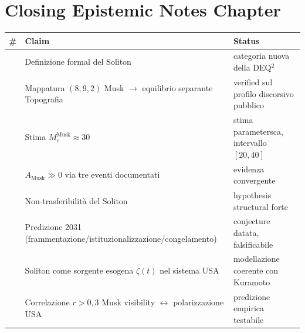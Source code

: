 \section{Closing Epistemic Notes
Chapter}\label{note-epistemiche-di-chiusura-chapter}

{\def\LTcaptype{none} %
{\small\begin{longtable}[]{@{}
  >{\raggedright\arraybackslash}p{}
  >{\raggedright\arraybackslash}p{}
  >{\raggedright\arraybackslash}p{}@{}}
\toprule\noalign{}
\begin{minipage}[b]{\linewidth}\raggedright
\#
\end{minipage} & \begin{minipage}[b]{\linewidth}\raggedright
Claim
\end{minipage} & \begin{minipage}[b]{\linewidth}\raggedright
Status
\end{minipage} \\
\midrule\noalign{}
\endhead
\bottomrule\noalign{}
\endlastfoot
1 & Definizione formal del Soliton & \Hypoth{} categoria nuova della
DEQ$^2$ \\
2 & Mappatura \((8, 9, 2)\) Musk $\to$ equilibrio separante Topografia &
\Proved{} verified sul profilo discorsivo pubblico \\
3 & Stima \(M_e^{\text{Musk}} \approx 30\) & \Conj{} stima parametersca,
intervallo \([20, 40]\) \\
4 & \(A_{\text{Musk}} \gg 0\) via tre eventi documentati & \Proved{}
evidenza convergente \\
5 & Non-trasferibilità del Soliton & \Hypoth{} hypothesis structural
forte \\
6 & Predizione 2031 (frammentazione/istituzionalizzazione/congelamento)
& \Conj{} conjecture datata, falsificabile \\
7 & Soliton come sorgente esogena \(\zeta(t)\) nel sistema USA &
\Hypoth{} modellazione coerente con Kuramoto \\
8 & Correlazione \(r > 0{,}3\) Musk visibility $\leftrightarrow$ polarizzazione USA &
\Conj{} predizione empirica testabile \\
\end{longtable}}
}


